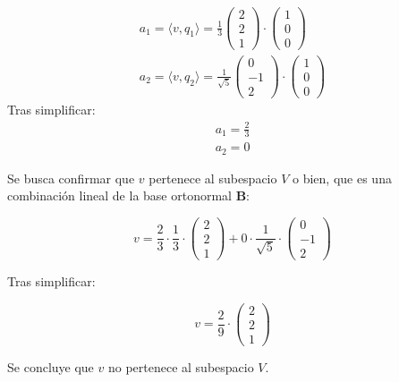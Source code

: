\documentclass[a4paper,spanish]{article}
\begin{document}
\begin{align*}
    a_1 = \langle v, q_1 \rangle = \frac{1}{3}\left(\begin{matrix}2 \\2\\1\end{matrix}\right) \cdot \left(\begin{matrix}1\\0\\0\end{matrix}\right) \\
    a_2 = \langle v, q_2 \rangle = \frac{1}{\sqrt{5}} \left(\begin{matrix}0 \\-1\\2\end{matrix}\right) \cdot \left(\begin{matrix}1\\0\\0\end{matrix}\right)
\end{align*}
Tras simplificar:
\begin{align*}
    a_1 =  \frac{2}{3} \\
    a_2 = 0
\end{align*}

Se busca confirmar que $v$ pertenece al subespacio $V$ o bien, que es una combinación lineal de la base ortonormal $\mathbf{B}$:

\[
    v = \frac{2}{3} \cdot \frac{1}{3} \cdot \left(\begin{matrix}2 \\2\\1\end{matrix}\right) + 0 \cdot \frac{1}{\sqrt{5}} \cdot \left(\begin{matrix}0 \\-1\\2\end{matrix}\right)
\]

Tras simplificar:

\[
    v = \frac{2}{9} \cdot \left(\begin{matrix}2 \\2\\1\end{matrix}\right)
\]

Se concluye que $v$ no pertenece al subespacio $V$.
\end{document}
